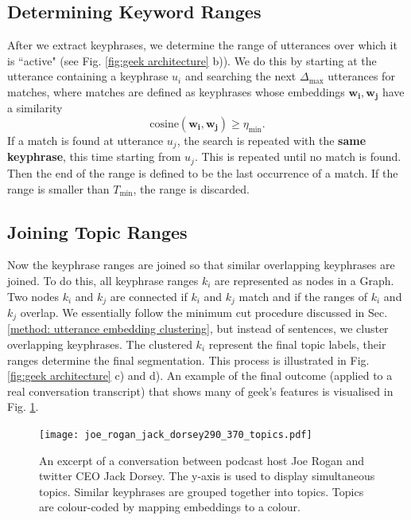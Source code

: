     \subsection{Determining Keyword Ranges}
        After we extract \glspl{keyphrase}, we determine the range of \glspl{utterance} over which it is ``active" (see Fig. \ref{fig:geek architecture} b)). We do this by starting at the \gls{utterance} containing a \gls{keyphrase} $u_i$ and searching the next $\Delta_{\text{max}}$ \glspl{utterance} for matches, where matches are defined as \glspl{keyphrase} whose \glspl{embedding} $\mathbf{w_i}, \mathbf{w_j}$ have a similarity
        \begin{equation}
            \text{cosine}(\mathbf{w_i}, \mathbf{w_j}) \geq \eta_{\text{min}}.
        \end{equation}
        If a match is found at \gls{utterance} $u_j$, the search is repeated with the \textbf{same \gls{keyphrase}}, this time starting from $u_j$. This is repeated until no match is found. Then the end of the range is defined to be the last occurrence of a match. If the range is smaller than $T_{\text{min}}$, the range is discarded.

    \subsection{Joining Topic Ranges}
        Now the \gls{keyphrase} ranges are joined so that similar overlapping \glspl{keyphrase} are joined. To do this, all \gls{keyphrase} ranges $k_i$ are represented as nodes in a Graph. Two nodes $k_i$ and $k_j$ are connected if $k_i$ and $k_j$ match and if the ranges of $k_i$ and $k_j$ overlap. We essentially follow the minimum cut procedure discussed in Sec. \ref{method: utterance embedding clustering}, but instead of sentences, we cluster overlapping \glspl{keyphrase}. The clustered $k_i$ represent the final topic labels, their ranges determine the final segmentation. This process is illustrated in Fig. \ref{fig:geek architecture} c) and d). An example of the final outcome (applied to a real conversation transcript) that shows many of \gls{geek}'s features is visualised in Fig. \ref{fig:GEEK final result}.

        \begin{figure}
            \centering
            \texttt{[image: joe\_rogan\_jack\_dorsey290\_370\_topics.pdf]}
            \caption{An excerpt of a conversation between podcast host Joe Rogan and twitter CEO Jack Dorsey. The y-axis is used to display simultaneous topics. Similar \glspl{keyphrase} are grouped together into topics. Topics are colour-coded by mapping \glspl{embedding} to a colour.}
            \label{fig:GEEK final result}
        \end{figure}

